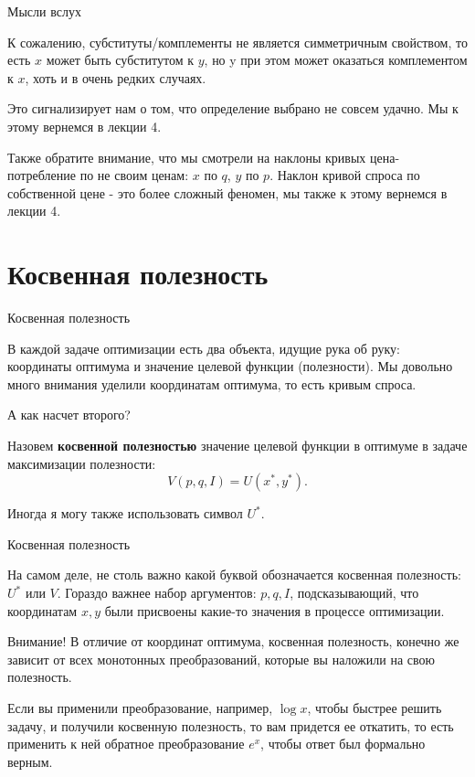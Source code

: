 \documentclass{beamer}
\begin{document}
\begin{frame}{Мысли вслух}

К сожалению, субституты/комплементы не является симметричным свойством, то есть $x$ может быть субститутом к $y$, но y при этом может оказаться комплементом к $x$, хоть и в очень редких случаях. 

Это сигнализирует нам о том, что определение выбрано не совсем удачно. Мы к этому вернемся в лекции 4.

Также обратите внимание, что мы смотрели на наклоны кривых цена-потребление по не своим ценам: $x$ по $q$, $y$ по $p$. Наклон кривой спроса по собственной цене - это более сложный феномен, мы также к этому вернемся в лекции 4.

\end{frame}

\section{Косвенная полезность}

\begin{frame}{Косвенная полезность}

В каждой задаче оптимизации есть два объекта, идущие рука об руку: координаты оптимума и значение целевой функции (полезности). Мы довольно много внимания уделили координатам оптимума, то есть кривым спроса. 

А как насчет второго?

\begin{definition}
Назовем \textbf{косвенной полезностью} значение целевой функции в оптимуме в задаче максимизации полезности:
$$ V(p,q,I) = U(x^{\ast}, y^{\ast}).$$
\end{definition}
Иногда я могу также использовать символ $U^{\ast}$.

\end{frame}

\begin{frame}{Косвенная полезность}

На самом деле, не столь важно какой буквой обозначается косвенная полезность: $U^{\ast}$ или $V$. Гораздо важнее набор аргументов: $p,q, I$, подсказывающий, что координатам $x,y$ были присвоены какие-то значения в процессе оптимизации.


Внимание! В отличие от координат оптимума, косвенная полезность, конечно же зависит от всех монотонных преобразований, которые вы наложили на свою полезность.

Если вы применили преобразование, например, $\log x$, чтобы быстрее решить задачу, и получили косвенную полезность, то вам придется ее откатить, то есть применить к ней обратное преобразование $e^x$, чтобы ответ был формально верным.

\end{frame}
\end{document}
